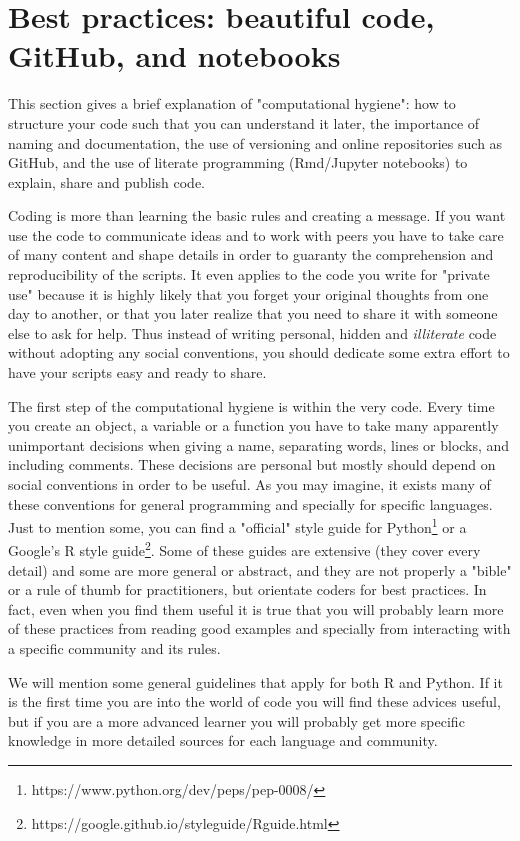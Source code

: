 \section{Best practices: beautiful code, GitHub, and notebooks}
\label{sec:practices}


This section gives a brief explanation of "computational hygiene": how to structure your code such that you can understand it later, the importance of naming and documentation, the use of versioning and online repositories such as GitHub, and the use of literate programming (Rmd/Jupyter notebooks) to explain, share and publish code.

Coding is more than learning the basic rules and creating a message. If you want use the code to communicate ideas and to work with peers you have to take care of many content and shape details in order to guaranty the comprehension and reproducibility of the scripts. It even applies to the code you write for "private use" because it is highly likely that you forget your original thoughts from one day to another, or that you later realize that you need to share it with someone else to ask for help. Thus instead of writing personal, hidden and \textit{illiterate} code without adopting any social conventions, you should dedicate some extra effort to have your scripts easy and ready to share.

The first step of the computational hygiene is within the very code. Every time you create an object, a variable or a function you have to take many apparently unimportant decisions when giving a name, separating words, lines or blocks, and including comments. These decisions are personal but mostly should depend on social conventions in order to be useful. As you may imagine, it exists many of these conventions for general programming and specially for specific languages. Just to mention some, you can find a "official" style guide for Python\footnote{https://www.python.org/dev/peps/pep-0008/}  or a Google's R style guide\footnote{https://google.github.io/styleguide/Rguide.html}. Some of these guides are extensive (they cover every detail) and some are more general or abstract, and they are not properly a "bible" or a rule of thumb for practitioners, but orientate  coders for best practices. In fact, even when you find them useful it is true that you will probably learn more of these practices from reading good examples and specially from interacting with a specific community and its rules.

We will mention some general guidelines that apply for both R and Python. If it is the first time you are into the world of code you will find these advices useful,  but if you are a more advanced learner you will probably get more specific knowledge in more detailed sources for each language and community.

